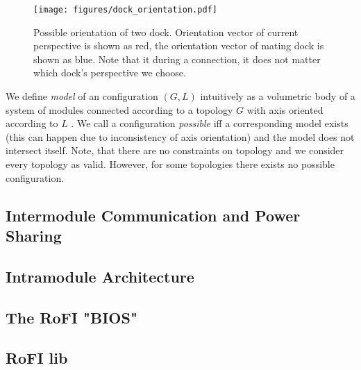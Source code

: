 \begin{figure}
    \centering
    \texttt{[image: figures/dock\_orientation.pdf]}
    \caption{Possible orientation of two dock. Orientation vector of current
    perspective is shown as red, the orientation vector of mating dock is shown
    as blue. Note that it during a connection, it does not matter which dock's
    perspective we choose.}
    \label{fig:dock_orientation}
\end{figure}

We define \emph{model} of an configuration $(G, L)$ intuitively as a volumetric
body of a system of modules connected according to a topology $G$ with
axis oriented according to $L$ . We call a configuration
\emph{possible} iff a corresponding model exists (this can happen due to
inconsistency of axis orientation) and the model does not intersect itself.
Note, that there are no constraints on topology and we consider every topology
as valid. However, for some topologies there exists no possible configuration.

\subsection{Intermodule Communication and Power Sharing}

\subsection{Intramodule Architecture}

\subsection{The RoFI "BIOS" }

\subsection{RoFI lib}


